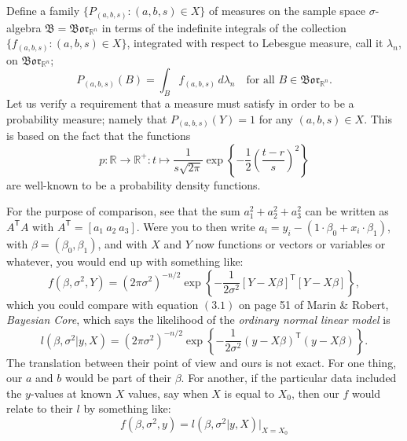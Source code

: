 \documentclass[
twoside=true,
paper=letter,
fontsize=9pt,
pagesize=auto,
leqno,
openany,
headsepline,
overfullrule,
]{scrbook}
\theoremstyle{plain}
\theoremstyle{plain}
\theoremstyle{definition}
\theoremstyle{bfnoteitalic}
\theoremstyle{bfnoteroman}
\newcommand{\sigalg}[1]{\mathfrak{#1}}
\newcommand{\borel}{\mathfrak{Bor}}
\newcommand{\textsigma}{\hbox{\large{$\sigma$}}\kern-1pt}
\newcommand{\R}{\mathbb{R}}
\newcommand{\function}{f}
\newcommand{\measurespace}{X}
\newcommand{\measurespaceii}{Y}
\newcommand{\setii}{B}
\newcommand{\pspace}{\measurespace}%
\newcommand{\sspace}{\measurespaceii}%
\newcommand{\sspacesig}{\sigalg{B}}
\begin{document}
Define a family $\{P_{(a,b,s)}:(a,b,s)\in\pspace\}$ of measures on the sample space \textsigma-algebra
$\sspacesig=\borel_{\R^n}$ in terms of the indefinite integrals of the collection
$\{ \function_{(a,b,s)} : (a,b,s)\in\pspace \}$, integrated with respect to Lebesgue measure, call it
$\lambda_{n}$, on
$\borel_{\R^n}$;
\[
P_{(a,b,s)}(\setii)=
\int_\setii \function_{(a,b,s)} \,d\lambda_{n}
\quad
\text{for all $\setii\in\borel_{\R^n}$}.
\]
Let us verify a requirement that a measure must satisfy in order to be a probability measure; namely that
$P_{(a,b,s)}(\sspace)=1$ for any $(a,b,s)\in\pspace$.
This is based on the fact that the functions
\[
p:\R\to\R^+
:t \mapsto
\frac{1}{s\sqrt{2\pi}}
\exp
\left\{
-\frac{1}{2}
\left(
\frac{t-r}{s}
\right)^2
\right\}
\]
are well-known to be a probability density functions.

\begin{quoting}\small
For the purpose of comparison, see that the sum
$a_1^2+a_2^2+a_3^2$ can be written as $A^{\textsf{T}}A$ with
$A^{\textsf{T}} = [a_1\ a_2\ a_3]$.
Were you to then write $a_i=y_i-(1\cdot\beta_0+x_i\cdot\beta_1)$, with $\beta=(\beta_0,\beta_1)$,  and with $X$ and $Y$ now functions or vectors or variables or whatever, you would end up with something like:
\[
\function(\beta,\sigma^2,Y)=
\left(2\pi\sigma^2\right)^{-n/2}
\exp\left\{
-\frac{1}{2\sigma^2}[Y-X\beta]^{\textsf{T}}[Y-X\beta]
\right\},
\]
which you could compare with equation $(3.1)$ on page 51 of Marin \& Robert, \textsl{Bayesian Core}, which says the likelihood of the \emph{ordinary normal linear model} is
\[
l(\beta,\sigma^2\vert y,X) 
=
\left(2\pi\sigma^2\right)^{-n/2}
\exp\left\{
-\frac{1}{2\sigma^2}(y-X\beta)^{\textsf{T}}(y-X\beta)
\right\}.
\]
The translation between their point of view and ours is not exact. For one thing,  our $a$ and $b$ would be part of their $\beta$.
For another, if the particular data included the $y$-values at known $X$ values, say when $X$ is equal to $X_0$, then our $f$ would relate to their $l$ by something like:
\[
f(\beta,\sigma^2,y)
=
l(\beta,\sigma^2\vert y,X)\Big|_{X=X_0}
\]
\end{quoting}
\end{document}
